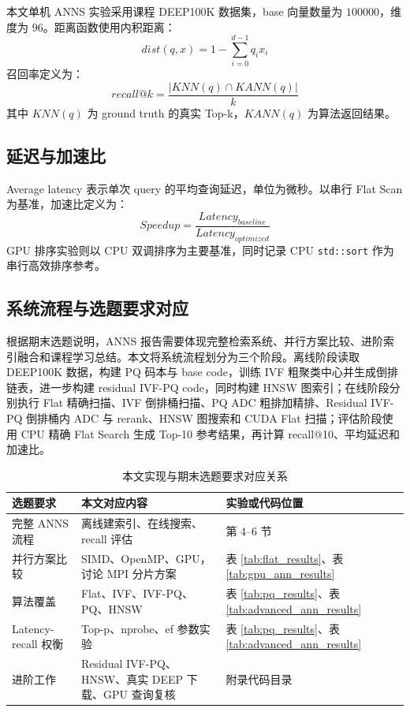 \documentclass[UTF8,a4paper,10pt]{ctexart}
\begin{document}
本文单机 ANNS 实验采用课程 DEEP100K 数据集，base 向量数量为 $100000$，维度为 $96$。距离函数使用内积距离：
\[
dist(q,x)=1-\sum_{i=0}^{d-1}q_i x_i
\]
召回率定义为：
\[
recall@k=\frac{|KNN(q)\cap KANN(q)|}{k}
\]
其中 $KNN(q)$ 为 ground truth 的真实 Top-k，$KANN(q)$ 为算法返回结果。

\subsection{延迟与加速比}

Average latency 表示单次 query 的平均查询延迟，单位为微秒。以串行 Flat Scan 为基准，加速比定义为：
\[
Speedup=\frac{Latency_{baseline}}{Latency_{optimized}}
\]
GPU 排序实验则以 CPU 双调排序为主要基准，同时记录 CPU \texttt{std::sort} 作为串行高效排序参考。

\subsection{系统流程与选题要求对应}

根据期末选题说明，ANNS 报告需要体现完整检索系统、并行方案比较、进阶索引融合和课程学习总结。本文将系统流程划分为三个阶段。离线阶段读取 DEEP100K 数据，构建 PQ 码本与 base code，训练 IVF 粗聚类中心并生成倒排链表，进一步构建 residual IVF-PQ code，同时构建 HNSW 图索引；在线阶段分别执行 Flat 精确扫描、IVF 倒排桶扫描、PQ ADC 粗排加精排、Residual IVF-PQ 倒排桶内 ADC 与 rerank、HNSW 图搜索和 CUDA Flat 扫描；评估阶段使用 CPU 精确 Flat Search 生成 Top-10 参考结果，再计算 recall@10、平均延迟和加速比。

\begin{table}[H]
\centering
\caption{本文实现与期末选题要求对应关系}
\label{tab:requirement_mapping}
\begin{tabular}{lll}
\toprule
选题要求 & 本文对应内容 & 实验或代码位置 \\
\midrule
完整 ANNS 流程 & 离线建索引、在线搜索、recall 评估 & 第 4--6 节 \\
并行方案比较 & SIMD、OpenMP、GPU，讨论 MPI 分片方案 & 表 \ref{tab:flat_results}、表 \ref{tab:gpu_ann_results} \\
算法覆盖 & Flat、IVF、IVF-PQ、PQ、HNSW & 表 \ref{tab:pq_results}、表 \ref{tab:advanced_ann_results} \\
Latency-recall 权衡 & Top-p、nprobe、ef 参数实验 & 表 \ref{tab:pq_results}、表 \ref{tab:advanced_ann_results} \\
进阶工作 & Residual IVF-PQ、HNSW、真实 DEEP 下载、GPU 查询复核 & 附录代码目录 \\
\bottomrule
\end{tabular}
\end{table}
\end{document}
